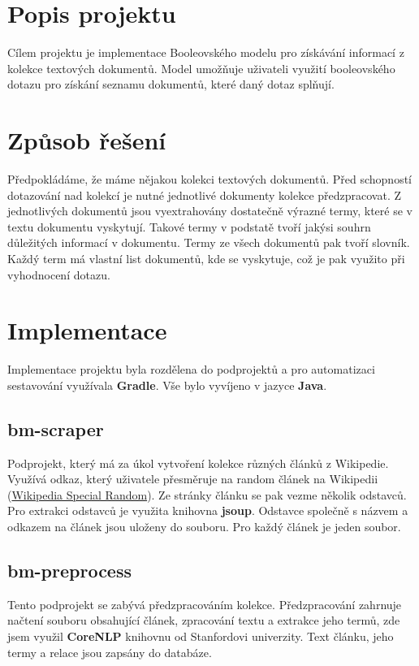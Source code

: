 \documentclass[12pt,a4paper]{article}
\begin{document}


\flushleft

\section*{Popis projektu}
Cílem projektu je implementace Booleovského modelu pro získávání informací z
kolekce textových dokumentů. Model umožňuje uživateli využití booleovského
dotazu pro získání seznamu dokumentů, které daný dotaz splňují.

\section*{Způsob řešení}
Předpokládáme, že máme nějakou kolekci textových dokumentů. Před schopností
dotazování nad kolekcí je nutné jednotlivé dokumenty kolekce předzpracovat. Z
jednotlivých dokumentů jsou vyextrahovány dostatečně výrazné termy, které se v
textu dokumentu vyskytují. Takové termy v podstatě tvoří jakýsi souhrn
důležitých informací v dokumentu. Termy ze všech dokumentů pak tvoří slovník.
Každý term má vlastní list dokumentů, kde se vyskytuje, což je pak využito při
vyhodnocení dotazu.

\section*{Implementace}
Implementace projektu byla rozdělena do podprojektů a pro automatizaci
sestavování využívala \textbf{Gradle}. Vše bylo vyvíjeno v jazyce \textbf{Java}.

\subsection*{bm-scraper}
Podprojekt, který má za úkol vytvoření kolekce různých článků z Wikipedie.
Využívá odkaz, který uživatele přesměruje na random článek na Wikipedii
(\href{https://en.wikipedia.org/wiki/Wikipedia:Special:Random}{Wikipedia Special Random}).
Ze stránky článku se pak vezme několik odstavců. Pro extrakci odstavců je využita
knihovna \textbf{jsoup}. Odstavce společně s názvem a odkazem na článek jsou
uloženy do souboru. Pro každý článek je jeden soubor.

\subsection*{bm-preprocess}
Tento podprojekt se zabývá předzpracováním kolekce. Předzpracování zahrnuje
načtení souboru obsahující článek, zpracování textu a extrakce jeho termů, zde
jsem využil \textbf{CoreNLP} knihovnu od Stanfordovi univerzity. Text článku,
jeho termy a relace jsou zapsány do databáze.
\end{document}
